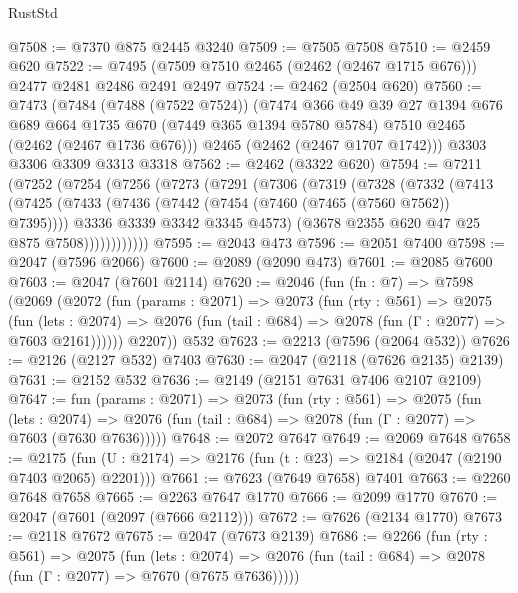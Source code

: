 \begin{lexlean}{RustStd}
\begin{coremodule}
@7508 := @7370 @875 @2445 @3240
@7509 := @7505 @7508
@7510 := @2459 @620
@7522 := @7495 (@7509 @7510 @2465 (@2462 (@2467 @1715 @676))) @2477 @2481 @2486 @2491 @2497
@7524 := @2462 (@2504 @620)
@7560 := @7473
    (@7484
      (@7488 (@7522 @7524))
      (@7474
        @366
        @49
        @39
        @27
        @1394
        @676
        @689
        @664
        @1735
        @670
        (@7449 @365 @1394 @5780 @5784)
        @7510
        @2465
        (@2462 (@2467 @1736 @676)))
      @2465
      (@2462 (@2467 @1707 @1742)))
    @3303
    @3306
    @3309
    @3313
    @3318
@7562 := @2462 (@3322 @620)
@7594 := @7211
    (@7252
      (@7254
        (@7256
          (@7273
            (@7291
              (@7306
                (@7319
                  (@7328
                    (@7332
                      (@7413
                        (@7425
                          (@7433
                            (@7436 (@7442 (@7454 (@7460 (@7465 (@7560 @7562)) @7395))))
                            @3336
                            @3339
                            @3342
                            @3345
                            @4573)
                          (@3678 @2355 @620 @47 @25 @875 @7508))))))))))))
@7595 := @2043 @473
@7596 := @2051 @7400
@7598 := @2047 (@7596 @2066)
@7600 := @2089 (@2090 @473)
@7601 := @2085 @7600
@7603 := @2047 (@7601 @2114)
@7620 := @2046
    (fun (fn : @7) =>
    @7598
      (@2069
        (@2072
          (fun (params : @2071) =>
          @2073
            (fun (rty : @561) =>
            @2075
              (fun (lets : @2074) =>
              @2076 (fun (tail : @684) => @2078 (fun (Γ : @2077) => @7603 @2161))))))
        @2207))
    @532
@7623 := @2213 (@7596 (@2064 @532))
@7626 := @2126 (@2127 @532) @7403
@7630 := @2047 (@2118 (@7626 @2135) @2139)
@7631 := @2152 @532
@7636 := @2149 (@2151 @7631 @7406 @2107 @2109)
@7647 := fun (params : @2071) =>
  @2073
    (fun (rty : @561) =>
    @2075
      (fun (lets : @2074) =>
      @2076 (fun (tail : @684) => @2078 (fun (Γ : @2077) => @7603 (@7630 @7636)))))
@7648 := @2072 @7647
@7649 := @2069 @7648
@7658 := @2175 (fun (U : @2174) => @2176 (fun (t : @23) => @2184 (@2047 (@2190 @7403 @2065) @2201)))
@7661 := @7623 (@7649 @7658) @7401
@7663 := @2260 @7648 @7658
@7665 := @2263 @7647 @1770
@7666 := @2099 @1770
@7670 := @2047 (@7601 (@2097 (@7666 @2112)))
@7672 := @7626 (@2134 @1770)
@7673 := @2118 @7672
@7675 := @2047 (@7673 @2139)
@7686 := @2266
    (fun (rty : @561) =>
    @2075
      (fun (lets : @2074) =>
      @2076 (fun (tail : @684) => @2078 (fun (Γ : @2077) => @7670 (@7675 @7636)))))

\end{coremodule}
\end{lexlean}
